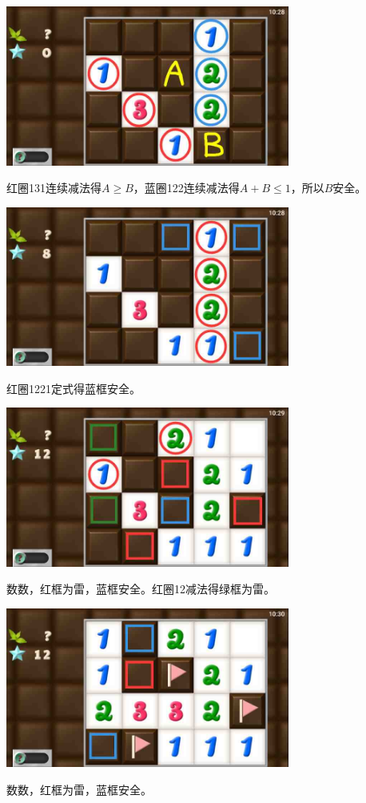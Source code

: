 \subsection{} %
\begin{center}
    \includegraphics[width=0.7\textwidth]{puzzlelow/178-1.jpg}
\end{center}
红圈131连续减法得$A\ge B$，蓝圈122连续减法得$A+B\le 1$，所以$B$安全。
\begin{center}
    \includegraphics[width=0.7\textwidth]{puzzlelow/178-2.jpg}
\end{center}
红圈1221定式得蓝框安全。
\begin{center}
    \includegraphics[width=0.7\textwidth]{puzzlelow/178-3.jpg}
\end{center}
数数，红框为雷，蓝框安全。红圈12减法得绿框为雷。
\begin{center}
    \includegraphics[width=0.7\textwidth]{puzzlelow/178-4.jpg}
\end{center}
数数，红框为雷，蓝框安全。

